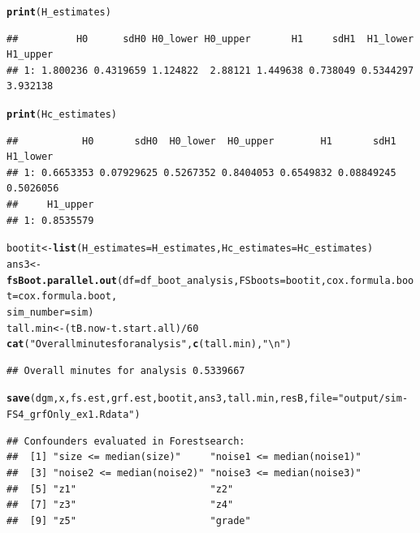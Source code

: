 \documentclass[smallextended]{svjour3}
\makeatletter
\newcommand{\hlnum}[1]{\textcolor[rgb]{0.686,0.059,0.569}{#1}}%
\newcommand{\hlstr}[1]{\textcolor[rgb]{0.192,0.494,0.8}{#1}}%
\newcommand{\hlopt}[1]{\textcolor[rgb]{0,0,0}{#1}}%
\newcommand{\hlstd}[1]{\textcolor[rgb]{0.345,0.345,0.345}{#1}}%
\newcommand{\hlkwb}[1]{\textcolor[rgb]{0.69,0.353,0.396}{#1}}%
\newcommand{\hlkwc}[1]{\textcolor[rgb]{0.333,0.667,0.333}{#1}}%
\newcommand{\hlkwd}[1]{\textcolor[rgb]{0.737,0.353,0.396}{\textbf{#1}}}%
\newenvironment{kframe}{%
 \def\at@end@of@kframe{}%
 \ifinner\ifhmode%
  \def\at@end@of@kframe{\end{minipage}}%
  \begin{minipage}{\columnwidth}%
 \fi\fi%
 \def\FrameCommand##1{\hskip\@totalleftmargin \hskip-\fboxsep
 \colorbox{shadecolor}{##1}\hskip-\fboxsep
     \hskip-\linewidth \hskip-\@totalleftmargin \hskip\columnwidth}%
 \MakeFramed {\advance\hsize-\width
   \@totalleftmargin\z@ \linewidth\hsize
   \@setminipage}}%
 {\par\unskip\endMakeFramed%
 \at@end@of@kframe}
\newenvironment{knitrout}{}{} %
\makeatother
\begin{document}
\begin{knitrout}
\begin{kframe}
\begin{alltt}
\hlkwd{print}\hlstd{(H_estimates)}
\end{alltt}
\begin{verbatim}
##          H0      sdH0 H0_lower H0_upper       H1     sdH1  H1_lower H1_upper
## 1: 1.800236 0.4319659 1.124822  2.88121 1.449638 0.738049 0.5344297 3.932138
\end{verbatim}
\begin{alltt}
\hlkwd{print}\hlstd{(Hc_estimates)}
\end{alltt}
\begin{verbatim}
##           H0       sdH0  H0_lower  H0_upper        H1       sdH1  H1_lower
## 1: 0.6653353 0.07929625 0.5267352 0.8404053 0.6549832 0.08849245 0.5026056
##     H1_upper
## 1: 0.8535579
\end{verbatim}
\begin{alltt}
\hlstd{bootit} \hlkwb{<-} \hlkwd{list}\hlstd{(}\hlkwc{H_estimates} \hlstd{= H_estimates,} \hlkwc{Hc_estimates} \hlstd{= Hc_estimates)}
\hlstd{ans3} \hlkwb{<-} \hlkwd{fsBoot.parallel.out}\hlstd{(}\hlkwc{df} \hlstd{= df_boot_analysis,} \hlkwc{FSboots} \hlstd{= bootit,} \hlkwc{cox.formula.boot} \hlstd{= cox.formula.boot,}
    \hlkwc{sim_number} \hlstd{= sim)}
\hlstd{tall.min} \hlkwb{<-} \hlstd{(tB.now} \hlopt{-} \hlstd{t.start.all)}\hlopt{/}\hlnum{60}
\hlkwd{cat}\hlstd{(}\hlstr{"Overall minutes for analysis"}\hlstd{,} \hlkwd{c}\hlstd{(tall.min),} \hlstr{"\textbackslash{}n"}\hlstd{)}
\end{alltt}
\begin{verbatim}
## Overall minutes for analysis 0.5339667
\end{verbatim}
\begin{alltt}
\hlkwd{save}\hlstd{(dgm, x, fs.est, grf.est, bootit, ans3, tall.min, resB,} \hlkwc{file} \hlstd{=} \hlstr{"output/sim-FS4_grfOnly_ex1.Rdata"}\hlstd{)}
\end{alltt}
\end{kframe}
\end{knitrout}



\begin{knitrout}
\color{fgcolor}\begin{kframe}
\begin{verbatim}
## Confounders evaluated in Forestsearch:
##  [1] "size <= median(size)"     "noise1 <= median(noise1)"
##  [3] "noise2 <= median(noise2)" "noise3 <= median(noise3)"
##  [5] "z1"                       "z2"                      
##  [7] "z3"                       "z4"                      
##  [9] "z5"                       "grade"
\end{verbatim}
\end{kframe}
\end{knitrout}
\end{document}
